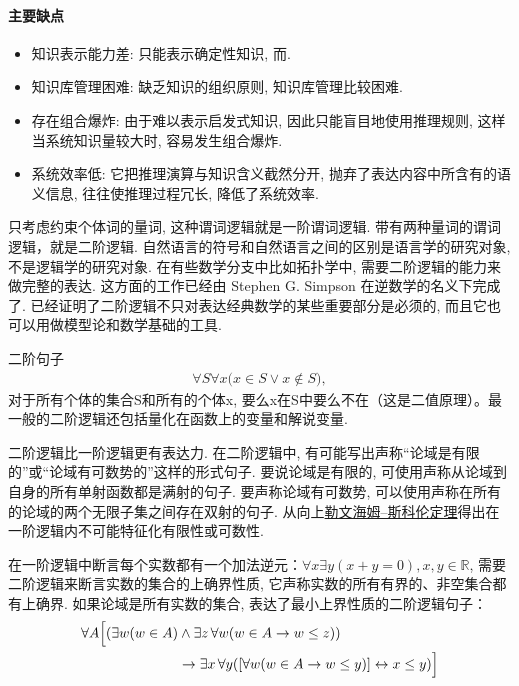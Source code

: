 \paragraph{主要缺点}
\begin{itemize}
\item 知识表示能力差: 只能表示确定性知识, 而.
\item 知识库管理困难: 缺乏知识的组织原则, 知识库管理比较困难.
\item 存在组合爆炸: 由于难以表示启发式知识, 因此只能盲目地使用推理规则, 这样当系统知识量较大时, 容易发生组合爆炸.
\item 系统效率低: 它把推理演算与知识含义截然分开, 抛弃了表达内容中所含有的语义信息, 往往使推理过程冗长, 降低了系统效率.
\end{itemize}

只考虑约束个体词的量词, 这种谓词逻辑就是一阶谓词逻辑. 带有两种量词的谓词逻辑，就是二阶逻辑.
自然语言的符号和自然语言之间的区别是语言学的研究对象, 不是逻辑学的研究对象.
在有些数学分支中比如拓扑学中, 需要二阶逻辑的能力来做完整的表达. 这方面的工作已经由 Stephen G. Simpson 在逆数学的名义下完成了.
已经证明了二阶逻辑不只对表达经典数学的某些重要部分是必须的, 而且它也可以用做模型论和数学基础的工具.

\begin{newexam}
\vspace{-0.2cm}
二阶句子
\begin{align}
    \forall S\forall x{\Big (}x\in S\vee x\notin S{\Big )},
\end{align}
对于所有个体的集合S和所有的个体x, 要么x在S中要么不在（这是二值原理）。最一般的二阶逻辑还包括量化在函数上的变量和解说变量.
\vspace{-0.2cm}
\end{newexam}

二阶逻辑比一阶逻辑更有表达力.
在二阶逻辑中, 有可能写出声称“论域是有限的”或“论域有可数势的”这样的形式句子. 要说论域是有限的, 可使用声称从论域到自身的所有单射函数都是满射的句子.
要声称论域有可数势, 可以使用声称在所有的论域的两个无限子集之间存在双射的句子.
从向上\href{https://zh.wikipedia.org/wiki/勒文海姆–斯科伦定理}{勒文海姆–斯科伦定理}得出在一阶逻辑内不可能特征化有限性或可数性.

\begin{newexam}
\vspace{-0.2cm}
在一阶逻辑中断言每个实数都有一个加法逆元：$\forall x \exists y(x + y = 0), x,y\in \mathbb R$, 需要二阶逻辑来断言实数的集合的上确界性质, 它声称实数的所有有界的、非空集合都有上确界. 如果论域是所有实数的集合, 表达了最小上界性质的二阶逻辑句子：
\begin{align}
  \forall A{\Big [}(\exists w(w\in A)&\land \exists z\,\forall w(w\in A\rightarrow w\leq z))\notag\\
                                     &\rightarrow \exists x\,\forall y([\forall w(w\in A\rightarrow w\leq y)]\leftrightarrow x\leq y){\Big ]}
\end{align}
\vspace{-0.2cm}
\end{newexam}

